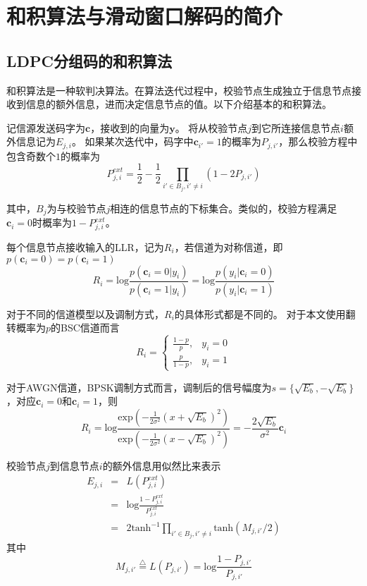 \chapter{和积算法与滑动窗口解码的简介}
\section{LDPC分组码的和积算法}
和积算法是一种软判决算法。在算法迭代过程中，校验节点生成独立于信息节点接收到信息的额外信息，进而决定信息节点的值。以下介绍基本的和积算法。

记信源发送码字为$\mathbf{c}$，接收到的向量为$\mathbf{y}$。
将从校验节点$j$到它所连接信息节点$i$额外信息记为$E_{j,i}$。
如果某次迭代中，码字中$\mathbf{c}_{i'}=1$的概率为$P_{j,i'}$，那么校验方程中包含奇数个$1$的概率为
\begin{equation}
P_{j,i}^{ext} = \frac{1}{2} - \frac{1}{2} \prod_{i' \in B_j, i' \neq i} (1-2P_{j,i'})
\end{equation}

其中，$B_j$为与校验节点$j$相连的信息节点的下标集合。类似的，校验方程满足$\mathbf{c}_{i}=0$时概率为$1-P_{j,i}^{ext}$。

每个信息节点接收输入的LLR，记为$R_i$，若信道为对称信道，即$p(\mathbf{c}_i=0) = p(\mathbf{c}_i=1)$
\begin{equation}
R_i= \text{log} \frac{p(\mathbf{c}_i=0|y_i)}{p(\mathbf{c}_i=1|y_i)} = \text{log} \frac{p(y_i|\mathbf{c}_i=0)}{p(y_i|\mathbf{c}_i=1)}
\end{equation}

对于不同的信道模型以及调制方式，$R_i$的具体形式都是不同的。
对于本文使用翻转概率为$p$的BSC信道而言
\begin{equation}
  R_i = \left \{
    \begin{array}{rl}
      \frac{1-p}{p}, & y_i=0 \\
      \frac{p}{1-p}, & y_i=1 
    \end{array} \right.
\end{equation}

对于AWGN信道，BPSK调制方式而言，调制后的信号幅度为$s=\{\sqrt{E_b},-\sqrt{E_b}\}$，对应$\mathbf{c}_i=0$和$\mathbf{c}_i=1$，则
\begin{equation}
R_i= \text{log} \frac{ \text{exp}(-\frac{1}{2\sigma^2}(x+\sqrt{E_b})^2) }{\text{exp}(-\frac{1}{2\sigma^2}(x-\sqrt{E_b})^2)} = -\frac{2\sqrt{E_b}}{\sigma^2}\mathbf{c}_i
\end{equation}

校验节点$j$到信息节点$i$的额外信息用似然比来表示
\begin{eqnarray}
E_{j,i} & = & L(P_{j,i}^{ext})\\
& = & \text{log} \frac{1-P_{j,i}^{ext}}{P_{j,i}^{ext}}\\
& = & 2 \text{tanh}^{-1} \prod_{i' \in B_j, i' \neq i} \text{tanh} (M_{j,i'}/2)
\end{eqnarray}
其中
\begin{equation}
M_{j,i'} \stackrel{\triangle}{=} L(P_{j,i'}) = \text{log} \frac{1-P_{j,i'}}{P_{j,i'}}
\end{equation}

